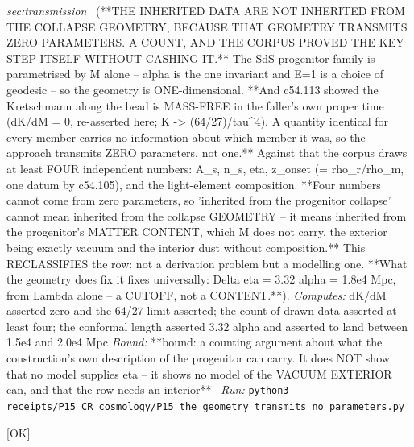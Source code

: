 \begin{description}
\textit{sec:transmission} \ (**THE INHERITED DATA ARE NOT INHERITED FROM THE COLLAPSE GEOMETRY, BECAUSE THAT GEOMETRY TRANSMITS ZERO PARAMETERS. A COUNT, AND THE CORPUS PROVED THE KEY STEP ITSELF WITHOUT CASHING IT.** The SdS progenitor family is parametrised by M alone -- alpha is the one invariant and E=1 is a choice of geodesic -- so the geometry is ONE-dimensional. **And c54.113 showed the Kretschmann along the bead is MASS-FREE in the faller's own proper time (dK/dM = 0, re-asserted here; K -> (64/27)/tau\textasciicircum{}4). A quantity identical for every member carries no information about which member it was, so the approach transmits ZERO parameters, not one.** Against that the corpus draws at least FOUR independent numbers: A\_s, n\_s, eta, z\_onset (= rho\_r/rho\_m, one datum by c54.105), and the light-element composition. **Four numbers cannot come from zero parameters, so 'inherited from the progenitor collapse' cannot mean inherited from the collapse GEOMETRY -- it means inherited from the progenitor's MATTER CONTENT, which M does not carry, the exterior being exactly vacuum and the interior dust without composition.** This RECLASSIFIES the row: not a derivation problem but a modelling one. **What the geometry does fix it fixes universally: \textbar{}Delta eta\textbar{} = 3.32 alpha = 1.8e4 Mpc, from Lambda alone -- a CUTOFF, not a CONTENT.**). 
\emph{Computes:} dK/dM asserted zero and the 64/27 limit asserted; the count of drawn data asserted at least four; the conformal length asserted 3.32 alpha and asserted to land between 1.5e4 and 2.0e4 Mpc
 \emph{Bound:} **bound: a counting argument about what the construction's own description of the progenitor can carry. It does NOT show that no model supplies eta -- it shows no model of the VACUUM EXTERIOR can, and that the row needs an interior**
\ \emph{Run:} \texttt{python3 receipts/P15\_CR\_cosmology/P15\_the\_geometry\_transmits\_no\_parameters.py}
\item[\rcptlabel{P15_hbar_survives_in_As_and_cancels_in_ns}{P15R86}\textbf{P15R86}\quad\texttt{P15\_hbar\_survives\_in\_As\_and\_cancels\_in\_ns}]\hfill\textsf{[OK]}\\

\end{description}
